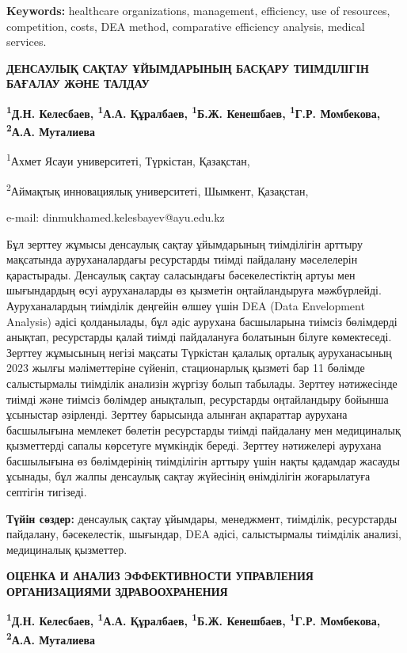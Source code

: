 {\bfseries Keywords:} healthcare organizations, management, efficiency, use
of resources, competition, costs, DEA method, comparative efficiency
analysis, medical services.

\begin{articleheader}
{\bfseries ДЕНСАУЛЫҚ САҚТАУ ҰЙЫМДАРЫНЫҢ БАСҚАРУ ТИІМДІЛІГІН БАҒАЛАУ ЖӘНЕ ТАЛДАУ}

{\bfseries
\textsuperscript{1}Д.Н. Келесбаев\textsuperscript{\envelope },
\textsuperscript{1}А.А. Құралбаев,
\textsuperscript{1}Б.Ж. Кенешбаев,
\textsuperscript{1}Г.Р. Момбекова,
\textsuperscript{2}А.А. Муталиева
}
\end{articleheader}

\begin{affiliation}
\textsuperscript{1}Ахмет Ясауи университеті, Түркістан, Қазақстан,

\textsuperscript{2}Аймақтық инновациялық университеті, Шымкент, Қазақстан,

e-mail: dinmukhamed.kelesbayev@ayu.edu.kz
\end{affiliation}

Бұл зерттеу жұмысы денсаулық сақтау ұйымдарының тиімділігін арттыру
мақсатында ауруханалардағы ресурстарды тиімді пайдалану мәселелерін
қарастырады. Денсаулық сақтау саласындағы бәсекелестіктің артуы мен
шығындардың өсуі ауруханаларды өз қызметін оңтайландыруға мәжбүрлейді.
Ауруханалардың тиімділік деңгейін өлшеу үшін DEA (Data Envelopment
Analysis) әдісі қолданылады, бұл әдіс аурухана басшыларына тиімсіз
бөлімдерді анықтап, ресурстарды қалай тиімді пайдалануға болатынын
білуге көмектеседі. Зерттеу жұмысының негізі мақсаты Түркістан қалалық
орталық ауруханасының 2023 жылғы мәліметтеріне сүйеніп, стационарлық
қызметі бар 11 бөлімде салыстырмалы тиімділік анализін жүргізу болып
табылады. Зерттеу нәтижесінде тиімді және тиімсіз бөлімдер анықталып,
ресурстарды оңтайландыру бойынша ұсыныстар әзірленді. Зерттеу барысында
алынған ақпараттар аурухана басшылығына мемлекет бөлетін ресурстарды
тиімді пайдалану мен медициналық қызметтерді сапалы көрсетуге мүмкіндік
береді. Зерттеу нәтижелері аурухана басшылығына өз бөлімдерінің
тиімділігін арттыру үшін нақты қадамдар жасауды ұсынады, бұл жалпы
денсаулық сақтау жүйесінің өнімділігін жоғарылатуға септігін тигізеді.

{\bfseries Түйін сөздер:} денсаулық сақтау ұйымдары, менеджмент, тиімділік,
ресурстарды пайдалану, бәсекелестік, шығындар, DEA әдісі, салыстырмалы
тиімділік анализі, медициналық қызметтер.

\begin{articleheader}
{\bfseries ОЦЕНКА И АНАЛИЗ ЭФФЕКТИВНОСТИ УПРАВЛЕНИЯ ОРГАНИЗАЦИЯМИ ЗДРАВООХРАНЕНИЯ}

{\bfseries
\textsuperscript{1}Д.Н. Келесбаев\textsuperscript{\envelope },
\textsuperscript{1}А.А. Құралбаев,
\textsuperscript{1}Б.Ж. Кенешбаев,
\textsuperscript{1}Г.Р. Момбекова,
\textsuperscript{2}А.А. Муталиева
}
\end{articleheader}

